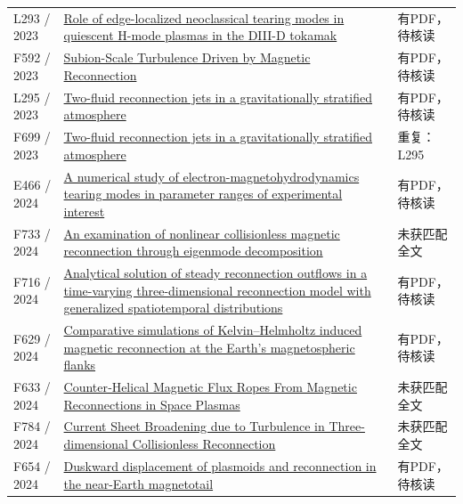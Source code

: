 \begin{longtable}{P{24mm}P{97mm}P{27mm}}
L293 / 2023 & \href{https://doi.org/10.1063/5.0137123}{Role of edge-localized neoclassical tearing modes in quiescent H-mode plasmas in the DIII-D tokamak} & 有PDF，待核读\\

F592 / 2023 & \href{https://doi.org/10.1103/physrevlett.130.205201}{Subion-Scale Turbulence Driven by Magnetic Reconnection} & 有PDF，待核读\\

L295 / 2023 & \href{https://doi.org/10.1051/0004-6361/202346659}{Two-fluid reconnection jets in a gravitationally stratified atmosphere} & 有PDF，待核读\\

F699 / 2023 & \href{https://doi.org/10.48550/arxiv.2307.05736}{Two-fluid reconnection jets in a gravitationally stratified atmosphere} & 重复：L295\\

E466 / 2024 & \href{https://doi.org/10.1063/5.0205061}{A numerical study of electron-magnetohydrodynamics tearing modes in parameter ranges of experimental interest} & 有PDF，待核读\\

F733 / 2024 & \href{https://doi.org/10.1063/5.0226026}{An examination of nonlinear collisionless magnetic reconnection through eigenmode decomposition} & 未获匹配全文\\

F716 / 2024 & \href{https://doi.org/10.3389/fphy.2024.1439949}{Analytical solution of steady reconnection outflows in a time-varying three-dimensional reconnection model with generalized spatiotemporal distributions} & 有PDF，待核读\\

F629 / 2024 & \href{https://doi.org/10.1063/5.0191674}{Comparative simulations of Kelvin–Helmholtz induced magnetic reconnection at the Earth's magnetospheric flanks} & 有PDF，待核读\\

F633 / 2024 & \href{https://doi.org/10.1029/2024gl108270}{Counter‐Helical Magnetic Flux Ropes From Magnetic Reconnections in Space Plasmas} & 未获匹配全文\\

F784 / 2024 & \href{https://doi.org/10.3847/1538-4357/ad7f54}{Current Sheet Broadening due to Turbulence in Three-dimensional Collisionless Reconnection} & 未获匹配全文\\

F654 / 2024 & \href{https://doi.org/10.1186/s40623-024-02003-w}{Duskward displacement of plasmoids and reconnection in the near-Earth magnetotail} & 有PDF，待核读\\


\end{longtable}

